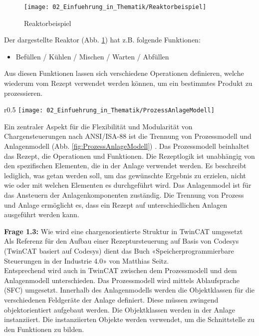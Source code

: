 		\begin{figure}[h!]
			\centering
			\texttt{[image: 02\_Einfuehrung\_in\_Thematik/Reaktorbeispiel]}
			\captionsetup{justification=centering}
			\caption{Reaktorbeispiel}
			\label{fig:Reaktorbeispiel}
		\end{figure}
		
		Der dargestellte Reaktor (Abb. \ref{fig:Reaktorbeispiel}) hat z.B. folgende Funktionen:
		\begin{itemize}
			\item Befüllen / Kühlen / Mischen / Warten / Abfüllen
		\end{itemize}
		\addvspace{3mm} 
		
		Aus diesen Funktionen lassen sich verschiedene Operationen definieren, welche wiederum vom Rezept verwendet werden können, um ein bestimmtes Produkt zu prozessieren. 
		\begin{wrapfigure}{r}{0.5\textwidth}
			\centering
			\texttt{[image: 02\_Einfuehrung\_in\_Thematik/ProzessAnlageModell]}
			\captionsetup{justification=centering}
			\caption{Prozess- und Anlagenmodell}
			\label{fig:ProzessAnlageModell}
		\end{wrapfigure}
		Ein zentraler Aspekt für die Flexibilität und Modularität von Chargensteuerungen nach ANSI/ISA-88 ist die Trennung von Prozessmodell und Anlagenmodell (Abb. \ref{fig:ProzessAnlageModell}) \cite{Seitz}. Das Prozessmodell beinhaltet das Rezept, die Operationen und Funktionen. Die Rezeptlogik ist unabhängig von den spezifischen Elementen, die in der Anlage verwendet werden. Es beschreibt lediglich, was getan werden soll, um das gewünschte Ergebnis zu erzielen, nicht wie oder mit welchen Elementen es durchgeführt wird. Das Anlagenmodel ist für das Ansteuern der Anlagenkomponenten zuständig. Die Trennung von Prozess und Anlage ermöglicht es, dass ein Rezept auf unterschiedlichen Anlagen ausgeführt werden kann. 
	\newpage
	
	\textbf{Frage 1.3:} Wie wird eine chargenorientierte Struktur in TwinCAT umgesetzt \vspace{2mm} 
	\\
		Als Referenz für den Aufbau einer Rezeptursteuerung auf Basis von Codesys (TwinCAT basiert auf Codesys) dient das Buch «Speicherprogrammierbare Steuerungen in der Industrie 4.0» von Matthias Seitz.
		\\
		Entsprechend wird auch in TwinCAT zwischen dem Prozessmodell und dem Anlagenmodell unterschieden. Das Prozessmodell wird mittels Ablaufsprache (\Gls{SFC}) umgesetzt. Innerhalb des Anlagenmodells werden die Objektklassen für die verschiedenen Feldgeräte der Anlage definiert. Diese müssen zwingend objektorientiert aufgebaut werden. Die Objektklassen werden in der Anlage instanziiert. Die instanziierten Objekte werden verwendet, um die Schnittstelle zu den Funktionen zu bilden. 
		
